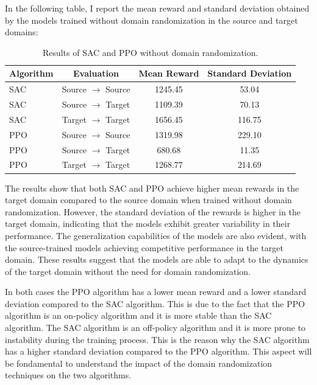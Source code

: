 \documentclass[12pt]{article}
\begin{document}
In the following table, I report the mean reward and standard deviation obtained by the models trained without domain randomization in the source and target domains:

\begin{table}[H]
    \centering
    \begin{tabular}{|l|c|c|c|}
        \hline
        \textbf{Algorithm} & \textbf{Evaluation} & \textbf{Mean Reward} & \textbf{Standard Deviation} \\ \hline
        SAC & Source $\rightarrow$ Source & 1245.45 & 53.04 \\ 
        SAC & Source $\rightarrow$ Target & 1109.39 & 70.13 \\ 
        SAC & Target $\rightarrow$ Target & 1656.45 & 116.75 \\ \hline
        PPO & Source $\rightarrow$ Source & 1319.98 & 229.10 \\ 
        PPO & Source $\rightarrow$ Target & 680.68 & 11.35 \\ 
        PPO & Target $\rightarrow$ Target & 1268.77 & 214.69 \\ \hline
    \end{tabular}
    \caption{Results of SAC and PPO without domain randomization.}
    \label{tab:results_no_randomization}
\end{table}

The results show that both SAC and PPO achieve higher mean rewards in the target domain compared to the source domain when trained without domain randomization. However, the standard deviation of the rewards is higher in the target domain, indicating that the models exhibit greater variability in their performance. The generalization capabilities of the models are also evident, with the source-trained models achieving competitive performance in the target domain. These results suggest that the models are able to adapt to the dynamics of the target domain without the need for domain randomization.

In both cases the PPO algorithm has a lower mean reward and a lower standard deviation compared to the SAC algorithm. This is due to the fact that the PPO algorithm is an on-policy algorithm and it is more stable than the SAC algorithm. The SAC algorithm is an off-policy algorithm and it is more prone to instability during the training process. This is the reason why the SAC algorithm has a higher standard deviation compared to the PPO algorithm. This aspect will be fondamental to understand the impact of the domain randomization techniques on the two algorithms. 
\end{document}
